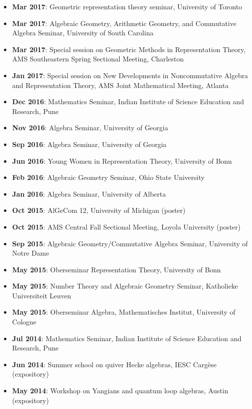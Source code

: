 \documentclass[a4paper]{moderncv}
\begin{document}
\begin{itemize}
\item \textbf{Mar 2017}: Geometric representation theory seminar, University of Toronto
\item \textbf{Mar 2017}: Algebraic Geometry, Arithmetic Geometry, and Commutative Algebra Seminar, University of South Carolina
\item \textbf{Mar 2017}: Special session on Geometric Methods in Representation Theory, AMS Southeastern Spring Sectional Meeting, Charleston
\item \textbf{Jan 2017}: Special session on New Developments in Noncommutative Algebra and Representation Theory, AMS Joint Mathematical Meeting, Atlanta
\item \textbf{Dec 2016}: Mathematics Seminar, Indian Institute of Science Education and Research, Pune
\item \textbf{Nov 2016}: Algebra Seminar, University of Georgia
\item \textbf{Sep 2016}: Algebra Seminar, University of Georgia
\item \textbf{Jun 2016}: Young Women in Representation Theory, University of Bonn
\item \textbf{Feb 2016}: Algebraic Geometry Seminar, Ohio State University
\item \textbf{Jan 2016}: Algebra Seminar, University of Alberta
\item \textbf{Oct 2015}: AlGeCom 12, University of Michigan (poster)
\item \textbf{Oct 2015}: AMS Central Fall Sectional Meeting, Loyola University (poster)
\item \textbf{Sep 2015}: Algebraic Geometry/Commutative Algebra Seminar, University of Notre Dame
\item \textbf{May 2015}: Oberseminar Representation Theory, University of Bonn
\item \textbf{May 2015}: Number Theory and Algebraic Geometry Seminar, Katholieke Universiteit Leuven
\item \textbf{May 2015}: Oberseminar Algebra, Mathematisches Institut, University of Cologne
\item \textbf{Jul 2014}: Mathematics Seminar, Indian Institute of Science Education and Research, Pune
\item \textbf{Jun 2014}: Summer school on quiver Hecke algebras, IESC Cargèse (expository)
\item \textbf{May 2014}: Workshop on Yangians and quantum loop algebras, Austin (expository)
\end{itemize}
\end{document}
